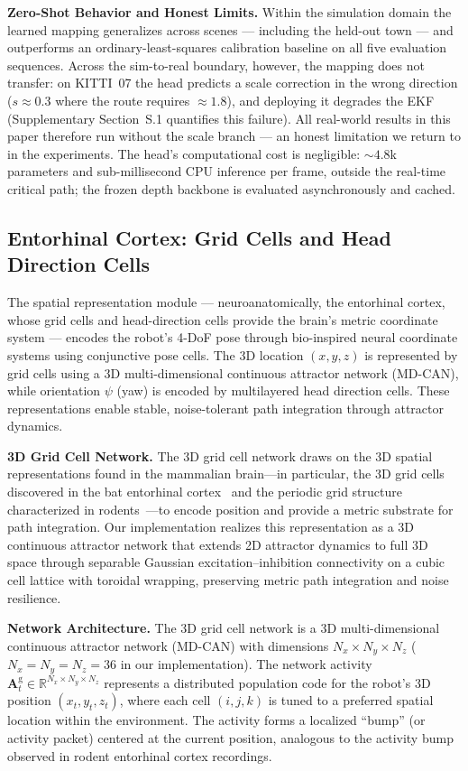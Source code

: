 \textbf{Zero-Shot Behavior and Honest Limits.} Within the simulation domain the learned mapping generalizes across scenes --- including the held-out town --- and outperforms an ordinary-least-squares calibration baseline on all five evaluation sequences. Across the sim-to-real boundary, however, the mapping does not transfer: on KITTI~07 the head predicts a scale correction in the wrong direction ($s\approx0.3$ where the route requires $\approx1.8$), and deploying it degrades the EKF (Supplementary Section~S.1 quantifies this failure). All real-world results in this paper therefore run without the scale branch --- an honest limitation we return to in the experiments. The head's computational cost is negligible: ${\sim}4.8$k parameters and sub-millisecond CPU inference per frame, outside the real-time critical path; the frozen depth backbone is evaluated asynchronously and cached.

\subsection{Entorhinal Cortex: Grid Cells and Head Direction Cells}
\label{sec:grid_cells}

The spatial representation module --- neuroanatomically, the entorhinal cortex, whose grid cells and head-direction cells provide the brain's metric coordinate system --- encodes the robot's 4-DoF pose through bio-inspired neural coordinate systems using conjunctive pose cells. The 3D location $(x, y, z)$ is represented by grid cells using a 3D multi-dimensional continuous attractor network (MD-CAN), while orientation $\psi$ (yaw) is encoded by multilayered head direction cells. These representations enable stable, noise-tolerant path integration through attractor dynamics.

\textbf{3D Grid Cell Network.} The 3D grid cell network draws on the 3D spatial representations found in the mammalian brain---in particular, the 3D grid cells discovered in the bat entorhinal cortex~\cite{finkelstein2016three} and the periodic grid structure characterized in rodents~\cite{hafting2005microstructure}---to encode position and provide a metric substrate for path integration. Our implementation realizes this representation as a 3D continuous attractor network that extends 2D attractor dynamics to full 3D space through separable Gaussian excitation--inhibition connectivity on a cubic cell lattice with toroidal wrapping, preserving metric path integration and noise resilience.

\textbf{Network Architecture.} The 3D grid cell network is a 3D multi-dimensional continuous attractor network (MD-CAN) with dimensions $N_x \times N_y \times N_z$ ($N_x = N_y = N_z = 36$ in our implementation). The network activity $\mathbf{A}^\mathrm{g}_t \in \mathbb{R}^{N_x \times N_y \times N_z}$ represents a distributed population code for the robot's 3D position $(x_t, y_t, z_t)$, where each cell $(i,j,k)$ is tuned to a preferred spatial location within the environment. The activity forms a localized ``bump'' (or activity packet) centered at the current position, analogous to the activity bump observed in rodent entorhinal cortex recordings.

